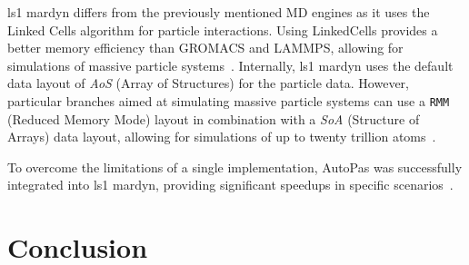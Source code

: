 \documentclass[conference]{IEEEtran}
\begin{document}
ls1 mardyn differs from the previously mentioned MD engines as it uses the Linked Cells algorithm for particle interactions. Using LinkedCells provides a better memory efficiency than GROMACS and LAMMPS, allowing for simulations of massive particle systems~\cite{tchipev2019twe}. Internally, ls1 mardyn uses the default data layout of \textit{AoS} (Array of Structures) for the particle data. However, particular branches aimed at simulating massive particle systems can use a \texttt{RMM} (Reduced Memory Mode) layout in combination with a \textit{SoA} (Structure of Arrays) data layout, allowing for simulations of up to twenty trillion atoms~\cite{tchipev2019twe}.

To overcome the limitations of a single implementation, AutoPas was successfully integrated into ls1 mardyn, providing significant speedups in specific scenarios~\cite{SECKLER2021101296}.


\section{Conclusion}








\newpage
\newpage
\tableofcontents
\end{document}
